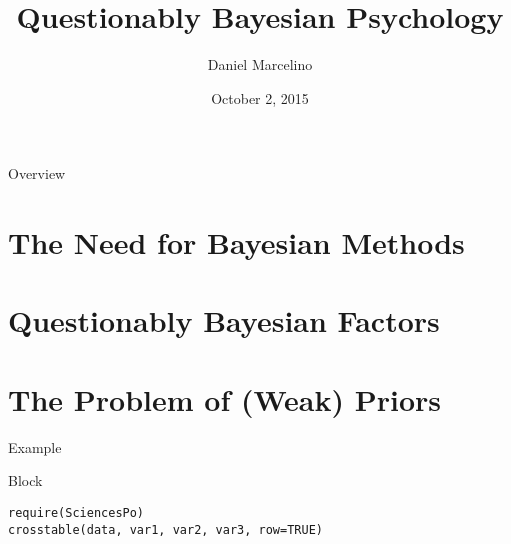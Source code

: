 \documentclass{beamer}
\title{Questionably Bayesian Psychology}
\date{October 2, 2015}
\author{Daniel Marcelino}
\institute{Instituto de Pesquisa Econômica Aplicada}
\begin{document}


\maketitle
\AtBeginSection{\frame{\sectionpage}}

\begin{frame}{Overview}
\tableofcontents
\end{frame}

\section{The Need for Bayesian Methods}


\section{Questionably Bayesian Factors}


\section{The Problem of (Weak) Priors}

\begin{frame}
\begin{exampleblock}{Example}

\end{exampleblock}

\end{frame}

\begin{frame}
\begin{block}{Block}

\end{block}

\end{frame}


\appendix

\backupbegin

\begin{frame}[fragile]

\begin{lstlisting}
require(SciencesPo)
crosstable(data, var1, var2, var3, row=TRUE)
\end{lstlisting}

\end{frame}

\backupend
\end{document}
